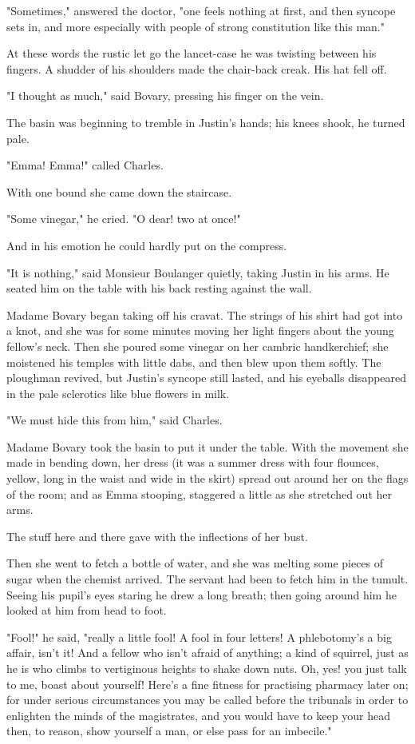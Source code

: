 \documentclass{tufte-book}
\begin{document}
"Sometimes," answered the doctor, "one feels nothing at first, and then
syncope sets in, and more especially with people of strong constitution
like this man."

At these words the rustic let go the lancet-case he was twisting between
his fingers. A shudder of his shoulders made the chair-back creak. His
hat fell off.

"I thought as much," said Bovary, pressing his finger on the vein.

The basin was beginning to tremble in Justin's hands; his knees shook,
he turned pale.

"Emma! Emma!" called Charles.

With one bound she came down the staircase.

"Some vinegar," he cried. "O dear! two at once!"

And in his emotion he could hardly put on the compress.

"It is nothing," said Monsieur Boulanger quietly, taking Justin in his
arms. He seated him on the table with his back resting against the wall.

Madame Bovary began taking off his cravat. The strings of his shirt had
got into a knot, and she was for some minutes moving her light fingers
about the young fellow's neck. Then she poured some vinegar on her
cambric handkerchief; she moistened his temples with little dabs, and
then blew upon them softly. The ploughman revived, but Justin's syncope
still lasted, and his eyeballs disappeared in the pale sclerotics like
blue flowers in milk.

"We must hide this from him," said Charles.

Madame Bovary took the basin to put it under the table. With the
movement she made in bending down, her dress (it was a summer dress with
four flounces, yellow, long in the waist and wide in the skirt) spread
out around her on the flags of the room; and as Emma stooping, staggered
a little as she stretched out her arms.

The stuff here and there gave with the inflections of her bust.

Then she went to fetch a bottle of water, and she was melting some
pieces of sugar when the chemist arrived. The servant had been to
fetch him in the tumult. Seeing his pupil's eyes staring he drew a long
breath; then going around him he looked at him from head to foot.

"Fool!" he said, "really a little fool! A fool in four letters! A
phlebotomy's a big affair, isn't it! And a fellow who isn't afraid of
anything; a kind of squirrel, just as he is who climbs to vertiginous
heights to shake down nuts. Oh, yes! you just talk to me, boast about
yourself! Here's a fine fitness for practising pharmacy later on; for
under serious circumstances you may be called before the tribunals in
order to enlighten the minds of the magistrates, and you would have to
keep your head then, to reason, show yourself a man, or else pass for an
imbecile."
\end{document}
